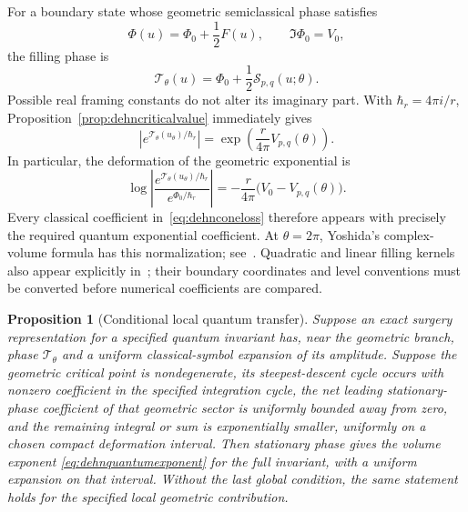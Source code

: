 \documentclass[11pt,a4paper]{article}
\numberwithin{equation}{section}
\newtheorem{proposition}[theorem]{Proposition}
\theoremstyle{definition}
\theoremstyle{remark}
\begin{document}
For a boundary state whose geometric semiclassical phase satisfies
\[
 \Phi(u)=\Phi_0+\frac12F(u),\qquad \Im\Phi_0=V_0,
\]
the filling phase is
\begin{equation}
 \mathcal T_\theta(u)=\Phi_0+\frac12\mathcal S_{p,q}(u;\theta).
 \label{eq:dehnquantumphase}
\end{equation}
Possible real framing constants do not alter its imaginary part.
With $\hbar_r=4\pi i/r$, Proposition~\ref{prop:dehncriticalvalue}
immediately gives
\begin{equation}
 \left|e^{\mathcal T_\theta(u_\theta)/\hbar_r}\right|
   =\exp\left(\frac{r}{4\pi}V_{p,q}(\theta)\right).
 \label{eq:dehnquantumexponent}
\end{equation}
In particular, the deformation of the geometric exponential is
\begin{equation}
 \log\left|\frac{e^{\mathcal T_\theta(u_\theta)/\hbar_r}}
                         {e^{\Phi_0/\hbar_r}}\right|
       =-\frac{r}{4\pi}\bigl(V_0-V_{p,q}(\theta)\bigr).
 \label{eq:dehnquantumresponse}
\end{equation}
Every classical coefficient in~\eqref{eq:dehnconeloss} therefore
appears with precisely the required quantum exponential coefficient.
At $\theta=2\pi$, Yoshida's complex-volume formula has this
normalization; see~\cite[equation (5.9)]{WongYangDehn}.
Quadratic and linear filling kernels also appear explicitly
in~\cite[equations (12)--(14)]{GangRomoYamazaki}; their boundary
coordinates and level conventions must be converted before numerical
coefficients are compared.

\begin{proposition}[Conditional local quantum transfer]
\label{prop:dehnquantumconditional}
Suppose an exact surgery representation for a specified quantum
invariant has, near the geometric branch, phase
$\mathcal T_\theta$ and a uniform classical-symbol expansion of
its amplitude. Suppose the geometric critical point is nondegenerate,
its steepest-descent cycle occurs with nonzero coefficient in the
specified integration cycle, the net leading stationary-phase
coefficient of that geometric sector is uniformly bounded away
from zero, and the remaining integral or sum is
exponentially smaller, uniformly on a chosen compact deformation
interval. Then stationary phase gives the volume exponent
\eqref{eq:dehnquantumexponent} for the full invariant, with a
uniform expansion on that interval. Without the last global
condition, the same statement holds for the specified local
geometric contribution.
\end{proposition}
\end{document}
